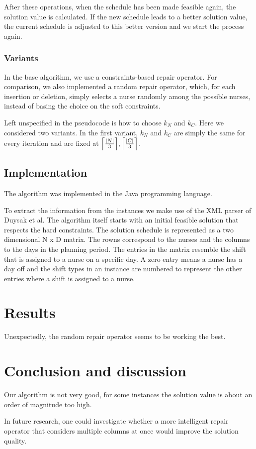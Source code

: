 \documentclass{article}
\begin{document}
After these operations, when the schedule has been made feasible again, the solution value is calculated.
If the new schedule leads to a better solution value, the current schedule is adjusted to this better version and we start the process again.

\subsubsection{Variants}

In the base algorithm, we use a constraints-based repair operator.
For comparison, we also implemented a random repair operator, which, for each insertion or deletion, simply selects a nurse randomly among the possible nurses, instead of basing the choice on the soft constraints.

Left unspecified in the pseudocode is how to choose $k_N$ and $k_C$.
Here we considered two variants.
In the first variant, $k_N$ and $k_C$ are simply the same for every iteration and are fixed at $\Bigl \lceil \frac{|N|}{3} \Bigr \rceil, \Bigl \lceil \frac{|C|}{3} \Bigr \rceil$.

\subsection{Implementation}

The algorithm was implemented in the Java programming language.

To extract the information from the instances we make use of the XML parser of Duysak et al.
The algorithm itself starts with an initial feasible solution that respects the hard constraints.
The solution schedule is represented as a two dimensional N x D matrix.
The rowns correspond to the nurses and the columns to the days in the planning period.
The entries in the matrix resemble the shift that is assigned to a nurse on a specific day.
A zero entry means a nurse has a day off and the shift types in an instance are numbered to represent the other entries where a shift is assigned to a nurse.

\section{Results}

Unexpectedly, the random repair operator seems to be working the best.

\section{Conclusion and discussion}

Our algorithm is not very good, for some instances the solution value is about an order of magnitude too high.

In future research, one could investigate whether a more intelligent repair operator that considers multiple columns at once would improve the solution quality.


\printbibliography
\end{document}
